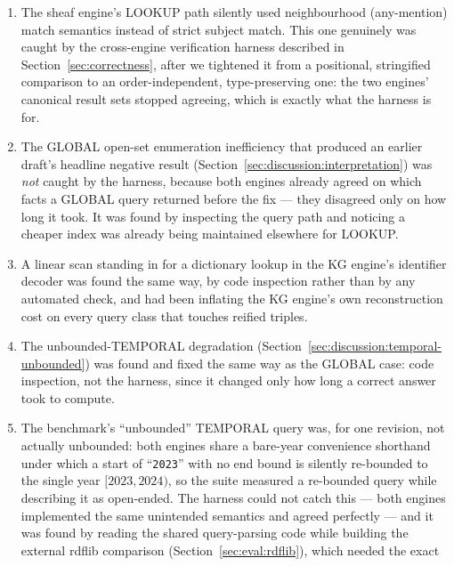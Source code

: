 \begin{enumerate}
    \item The sheaf engine's LOOKUP path silently used neighbourhood
          (any-mention) match semantics instead of strict subject match.
          This one genuinely was caught by the cross-engine verification
          harness described in Section~\ref{sec:correctness}, after we
          tightened it from a positional, stringified comparison to an
          order-independent, type-preserving one: the two engines'
          canonical result sets stopped agreeing, which is exactly what
          the harness is for.
    \item The GLOBAL open-set enumeration inefficiency that produced an
          earlier draft's headline negative result (Section~\ref{sec:discussion:interpretation})
          was \emph{not} caught by the harness, because both engines
          already agreed on which facts a GLOBAL query returned before the
          fix --- they disagreed only on how long it took. It was found by
          inspecting the query path and noticing a cheaper index was
          already being maintained elsewhere for LOOKUP.
    \item A linear scan standing in for a dictionary lookup in the KG
          engine's identifier decoder was found the same way, by code
          inspection rather than by any automated check, and had been
          inflating the KG engine's own reconstruction cost on every
          query class that touches reified triples.
    \item The unbounded-TEMPORAL degradation
          (Section~\ref{sec:discussion:temporal-unbounded}) was found and
          fixed the same way as the GLOBAL case: code inspection, not the
          harness, since it changed only how long a correct answer took to
          compute.
    \item The benchmark's ``unbounded'' TEMPORAL query was, for one
          revision, not actually unbounded: both engines share a
          bare-year convenience shorthand under which a start of
          ``\texttt{2023}'' with no end bound is silently re-bounded to
          the single year $[2023, 2024)$, so the suite measured a
          re-bounded query while describing it as open-ended. The
          harness could not catch this --- both engines implemented the
          same unintended semantics and agreed perfectly --- and it was
          found by reading the shared query-parsing code while building
          the external rdflib comparison
          (Section~\ref{sec:eval:rdflib}), which needed the exact

\end{enumerate}
